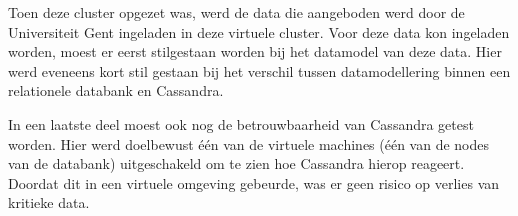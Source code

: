 Toen deze cluster opgezet was, werd de data die aangeboden werd door de Universiteit Gent ingeladen in deze virtuele cluster.
Voor deze data kon ingeladen worden, moest er eerst stilgestaan worden bij het datamodel van deze data.
Hier werd eveneens kort stil gestaan bij het verschil tussen datamodellering binnen een relationele databank en Cassandra. 

In een laatste deel moest ook nog de betrouwbaarheid van Cassandra getest worden.
Hier werd doelbewust één van de virtuele machines (één van de nodes van de databank) uitgeschakeld om te zien hoe Cassandra hierop reageert.
Doordat dit in een virtuele omgeving gebeurde, was er geen risico op verlies van kritieke data.